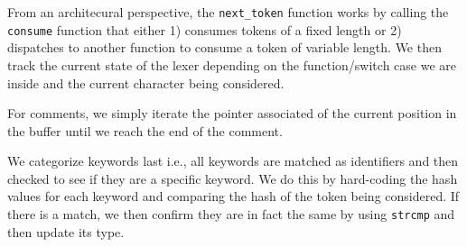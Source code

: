 From an architecural perspective, the \verb|next_token| function works by calling the \verb|consume| function that either 1) consumes tokens of a fixed length or 2) dispatches to another function to consume a token of variable length. We then track the current state of the lexer depending on the function/switch case we are inside and the current character being considered. 

For comments, we simply iterate the pointer associated of the current position in the buffer until we reach the end of the comment.

We categorize keywords last i.e., all keywords are matched as identifiers and then checked to see if they are a specific keyword. We do this by hard-coding the hash values for each keyword and comparing the hash of the token being considered. If there is a match, we then confirm they are in fact the same by using \verb|strcmp| and then update its type.